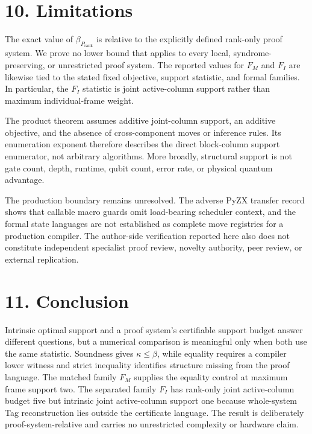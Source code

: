\documentclass[11pt]{article}
\begin{document}
\hypertarget{limitations}{%
\section*{10. Limitations}\label{limitations}}

The exact value of \(\beta_{P_{\mathrm{rank}}}\) is relative to the explicitly defined rank-only proof system. We prove no lower bound that applies to every local, syndrome-preserving, or unrestricted proof system. The reported values for \(F_M\) and \(F_I\) are likewise tied to the stated fixed objective, support statistic, and formal families. In particular, the \(F_I\) statistic is joint active-column support rather than maximum individual-frame weight.

The product theorem assumes additive joint-column support, an additive objective, and the absence of cross-component moves or inference rules. Its enumeration exponent therefore describes the direct block-column support enumerator, not arbitrary algorithms. More broadly, structural support is not gate count, depth, runtime, qubit count, error rate, or physical quantum advantage.

The production boundary remains unresolved. The adverse PyZX transfer record shows that callable macro guards omit load-bearing scheduler context, and the formal state languages are not established as complete move registries for a production compiler. The author-side verification reported here also does not constitute independent specialist proof review, novelty authority, peer review, or external replication.

\hypertarget{conclusion}{%
\section*{11. Conclusion}\label{conclusion}}

Intrinsic optimal support and a proof system's certifiable support budget answer different questions, but a numerical comparison is meaningful only when both use the same statistic. Soundness gives \(\kappa\leq\beta\), while equality requires a compiler lower witness and strict inequality identifies structure missing from the proof language. The matched family \(F_M\) supplies the equality control at maximum frame support two. The separated family \(F_I\) has rank-only joint active-column budget five but intrinsic joint active-column support one because whole-system Tag reconstruction lies outside the certificate language. The result is deliberately proof-system-relative and carries no unrestricted complexity or hardware claim.
\end{document}
